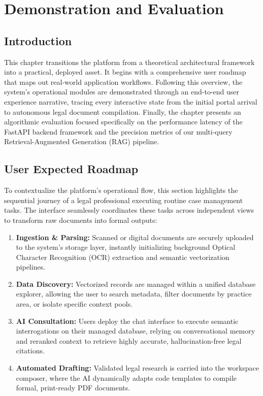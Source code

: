 \chapter{Demonstration and Evaluation}
\label{chap:Demonstration_and_Evaluation}

\section*{Introduction}
This chapter transitions the platform from a theoretical architectural framework into a practical, deployed asset. It begins with a comprehensive user roadmap that maps out real-world application workflows. Following this overview, the system's operational modules are demonstrated through an end-to-end user experience narrative, tracing every interactive state from the initial portal arrival to autonomous legal document compilation. Finally, the chapter presents an algorithmic evaluation focused specifically on the performance latency of the FastAPI backend framework and the precision metrics of our multi-query Retrieval-Augmented Generation (RAG) pipeline.

\pagebreak

\section{User Expected Roadmap}
To contextualize the platform's operational flow, this section highlights the sequential journey of a legal professional executing routine case management tasks. The interface seamlessly coordinates these tasks across independent views to transform raw documents into formal outputs:

\begin{enumerate}
    \item \textbf{Ingestion \& Parsing:} Scanned or digital documents are securely uploaded to the system's storage layer, instantly initializing background Optical Character Recognition (OCR) extraction and semantic vectorization pipelines.
    \item \textbf{Data Discovery:} Vectorized records are managed within a unified database explorer, allowing the user to search metadata, filter documents by practice area, or isolate specific context pools.
    \item \textbf{AI Consultation:} Users deploy the chat interface to execute semantic interrogations on their managed database, relying on conversational memory and reranked context to retrieve highly accurate, hallucination-free legal citations.
    \item \textbf{Automated Drafting:} Validated legal research is carried into the workspace composer, where the AI dynamically adapts code templates to compile formal, print-ready PDF documents.
\end{enumerate}

